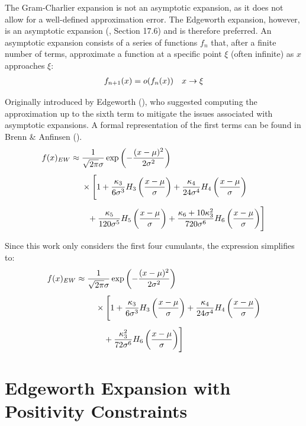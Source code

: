 The Gram-Charlier expansion is not an asymptotic expansion, as it does not allow for a well-defined approximation error. The Edgeworth expansion, however, is an asymptotic expansion (\cite{cramerMathematicalMethodsStatistics1999}, Section 17.6) and is therefore preferred. An asymptotic expansion consists of a series of functions $f_n$ that, after a finite number of terms, approximate a function at a specific point $\xi$ (often infinite) as $x$ approaches $\xi$:
\begin{align}
    f_{n+1}(x) = o(f_n(x)) \quad x\to\xi \notag
\end{align}

Originally introduced by Edgeworth (\citeyear{edgeworthRepresentationStatisticalFrequency1907}), who suggested computing the approximation up to the sixth term to mitigate the issues associated with asymptotic expansions. A formal representation of the first terms can be found in Brenn \& Anfinsen (\citeyear{brennRevisitGramCharlierEdgeworth2017}).
\begin{align}
    f(x)_{EW} \approx &\; \frac{1}{\sqrt{2\pi}\sigma}\exp\left(-\frac{(x-\mu)^2}{2\sigma^2}\right) \notag\\[1ex]
    &\; \times \Biggl[ 1 
        + \frac{\kappa_3}{6\sigma^3}H_3\left(\frac{x-\mu}{\sigma}\right) + \frac{\kappa_4}{24\sigma^4}H_4\left(\frac{x-\mu}{\sigma}\right) \notag\\[1ex]
    &\quad + \frac{\kappa_5}{120\sigma^5}H_5\left(\frac{x-\mu}{\sigma}\right) + \frac{\kappa_6 + 10\kappa_3^2}{720\sigma^6}H_6\left(\frac{x-\mu}{\sigma}\right)
    \Biggr] \notag
\end{align}
    
Since this work only considers the first four cumulants, the expression simplifies to:
\begin{align}
    f(x)_{EW} \approx {} & \frac{1}{\sqrt{2\pi}\sigma}\exp\left(-\frac{(x-\mu)^2}{2\sigma^2}\right)\notag\\[1ex]
    & \quad \times \Biggl[ 1 
       + \frac{\kappa_3}{6\sigma^3}H_3\left(\frac{x-\mu}{\sigma}\right) + \frac{\kappa_4}{24\sigma^4}H_4\left(\frac{x-\mu}{\sigma}\right) \notag\\[1ex]
    \label{eq:ew_expansion_short}
    & \quad \quad + \frac{\kappa_3^2}{72\sigma^6}H_6\left(\frac{x-\mu}{\sigma}\right)
    \Biggr]
\end{align}    

\section{Edgeworth Expansion with Positivity Constraints}

